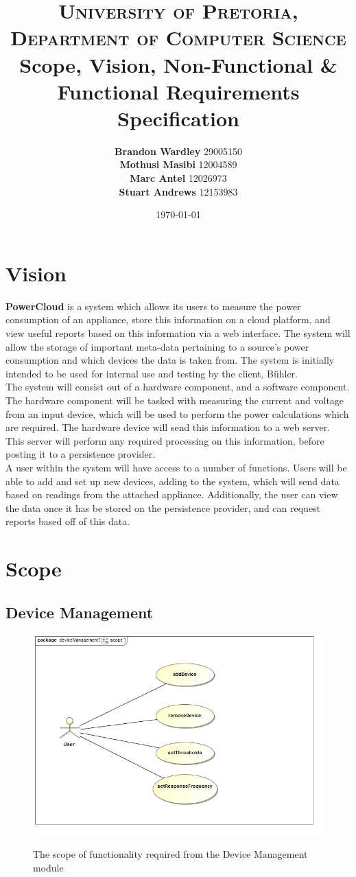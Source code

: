 \documentclass[paper=a4, fontsize=11pt]{scrartcl} %
\title {
	\normalfont \normalsize 
	\textsc{University of Pretoria, Department of Computer Science} \\ [25pt]
	\huge Scope, Vision, Non-Functional \& Functional Requirements Specification\\
}
\author {
	\textbf{Brandon Wardley} 29005150 \\
	\textbf{Mothusi Masibi} 12004589\\
	\textbf{Marc Antel} 12026973\\
	\textbf{Stuart Andrews} 12153983\\
}
\date{\normalsize\today} %
\begin{document}
	\maketitle %
	\newpage
	\section{Vision}
	\textbf{PowerCloud} is a system which allows its users to measure the power consumption of an appliance, store this information on a cloud platform, and view useful reports based on this information via a web interface. The system will allow the storage of important meta-data pertaining to a source's power consumption and which devices the data is taken from. The system is initially intended to be used for internal use and testing by the client, Bühler.\\
	
	The system will consist out of a hardware component, and a software component. The hardware component will be tasked with measuring the current and voltage from an input device, which will be used to perform the power calculations which are required. The hardware device will send this information to a web server. This server will perform any required processing on this information, before posting it to a persistence provider.\\
	
	A user within the system will have access to a number of functions. Users will be able to add and set up new devices, adding to the system, which will send data based on readings from the attached appliance. Additionally, the user can view the data once it has be stored on the persistence provider, and can request reports based off of this data.
	\newpage
	\section{Scope}
	\subsection{Device Management}
		\begin{figure}
			\includegraphics[width=\textwidth]{images/deviceManagementScope.jpg}  \\
			\caption{The scope of functionality required from the Device Management module}
		\end{figure}
		
\end{document}
